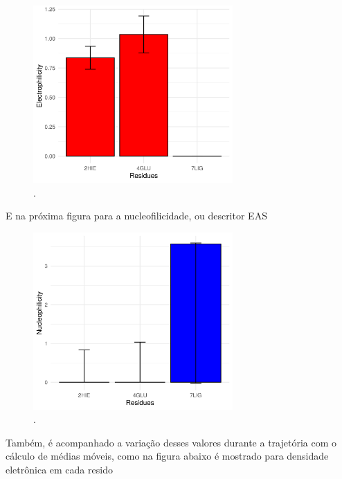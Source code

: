 \documentclass[a4paper,11pt]{refart}
\begin{document}
\hspace*{-\leftmarginwidth}
\begin{minipage}{\fullwidth}
	\begin{figure}[H]
		\begin{center}
			\includegraphics[width=3in]{images/tut6_img12}
			\caption{.}
			\label{fig_tut6_11}
		\end{center}
	\end{figure}
\end{minipage}

E na próxima figura para a nucleofilicidade, ou descritor EAS

\hspace*{-\leftmarginwidth}
\begin{minipage}{\fullwidth}
	\begin{figure}[H]
		\begin{center}
			\includegraphics[width=3in]{images/tut6_img13}
			\caption{.}
			\label{fig_tut6_12}
		\end{center}
	\end{figure}
\end{minipage}


Também, é acompanhado a variação desses valores durante a trajetória com o cálculo de médias móveis, como na figura abaixo é mostrado para densidade eletrônica em cada resido 
\end{document}
